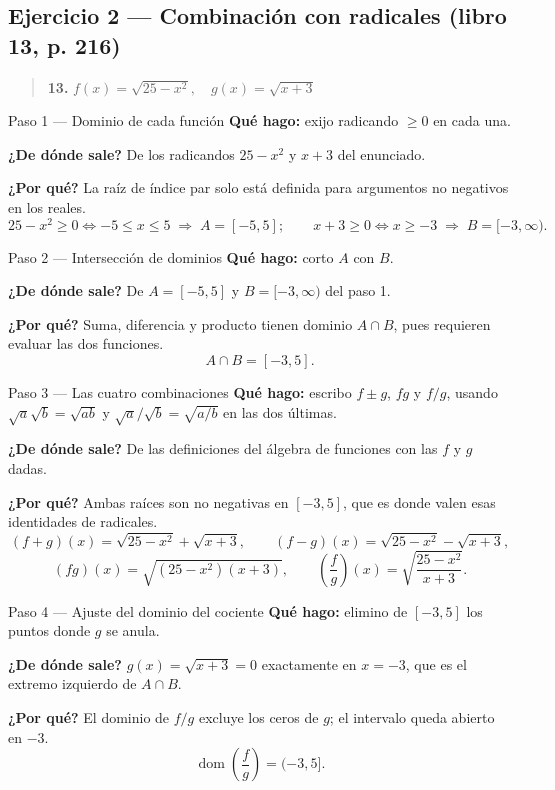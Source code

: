 \documentclass[11pt]{article}
\begin{document}
\subsection*{Ejercicio 2 — Combinación con radicales (libro 13, p. 216)}

\begin{quote}
\textbf{13.} $f(x)=\sqrt{25-x^2}, \quad g(x)=\sqrt{x+3}$
\end{quote}

\begin{paso}{Paso 1 --- Dominio de cada función}
\textbf{Qué hago:} exijo radicando $\ge 0$ en cada una.

\textbf{¿De dónde sale?} De los radicandos $25-x^2$ y $x+3$ del enunciado.

\textbf{¿Por qué?} La raíz de índice par solo está definida para argumentos no negativos en los reales.
\[
25-x^2\ge 0 \iff -5\le x\le 5 \;\Rightarrow\; A=[-5,5];\qquad
x+3\ge 0 \iff x\ge -3 \;\Rightarrow\; B=[-3,\infty).
\]
\end{paso}

\begin{paso}{Paso 2 --- Intersección de dominios}
\textbf{Qué hago:} corto $A$ con $B$.

\textbf{¿De dónde sale?} De $A=[-5,5]$ y $B=[-3,\infty)$ del paso 1.

\textbf{¿Por qué?} Suma, diferencia y producto tienen dominio $A\cap B$, pues requieren evaluar las dos funciones.
\[
A\cap B=[-3,5].
\]
\end{paso}

\begin{paso}{Paso 3 --- Las cuatro combinaciones}
\textbf{Qué hago:} escribo $f\pm g$, $fg$ y $f/g$, usando $\sqrt{a}\sqrt{b}=\sqrt{ab}$ y $\sqrt{a}/\sqrt{b}=\sqrt{a/b}$ en las dos últimas.

\textbf{¿De dónde sale?} De las definiciones del álgebra de funciones con las $f$ y $g$ dadas.

\textbf{¿Por qué?} Ambas raíces son no negativas en $[-3,5]$, que es donde valen esas identidades de radicales.
\[
(f+g)(x)=\sqrt{25-x^2}+\sqrt{x+3},\qquad (f-g)(x)=\sqrt{25-x^2}-\sqrt{x+3},
\]
\[
(fg)(x)=\sqrt{(25-x^2)(x+3)},\qquad \left(\frac{f}{g}\right)(x)=\sqrt{\frac{25-x^2}{x+3}} .
\]
\end{paso}

\begin{paso}{Paso 4 --- Ajuste del dominio del cociente}
\textbf{Qué hago:} elimino de $[-3,5]$ los puntos donde $g$ se anula.

\textbf{¿De dónde sale?} $g(x)=\sqrt{x+3}=0$ exactamente en $x=-3$, que es el extremo izquierdo de $A\cap B$.

\textbf{¿Por qué?} El dominio de $f/g$ excluye los ceros de $g$; el intervalo queda abierto en $-3$.
\[
\operatorname{dom}\left(\frac{f}{g}\right)=(-3,5].
\]
\end{paso}
\end{document}
